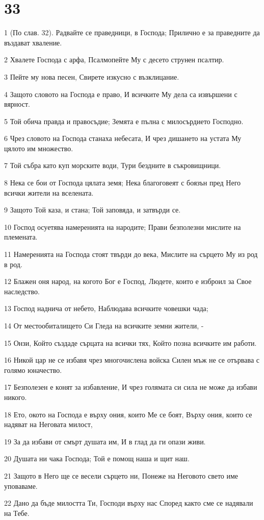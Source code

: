 \chapter{33}

\par 1 (По слав. 32). Радвайте се праведници, в Господа; Прилично е за праведните да въздават хваление.
\par 2 Хвалете Господа с арфа, Псалмопейте Му с десето струнен псалтир.
\par 3 Пейте му нова песен, Свирете изкусно с възклицание.
\par 4 Защото словото на Господа е право, И всичките Му дела са извършени с вярност.
\par 5 Той обича правда и правосъдие; Земята е пълна с милосърдието Господно.
\par 6 Чрез словото на Господа станаха небесата, И чрез дишането на устата Му цялото им множество.
\par 7 Той събра като куп морските води, Тури бездните в съкровищници.
\par 8 Нека се бои от Господа цялата земя; Нека благоговеят с боязън пред Него всички жители на вселената.
\par 9 Защото Той каза, и стана; Той заповяда, и затвърди се.
\par 10 Господ осуетява намеренията на народите; Прави безполезни мислите на племената.
\par 11 Намеренията на Господа стоят твърди до века, Мислите на сърцето Му из род в род.
\par 12 Блажен оня народ, на когото Бог е Господ, Людете, които е изброил за Свое наследство.
\par 13 Господ наднича от небето, Наблюдава всичките човешки чада;
\par 14 От местообиталището Си Гледа на всичките земни жители, -
\par 15 Онзи, Който създаде сърцата на всички тях, Който позна всичките им работи.
\par 16 Никой цар не се избавя чрез многочислена войска Силен мъж не се отървава с голямо юначество.
\par 17 Безполезен е конят за избавление, И чрез голямата си сила не може да избави никого.
\par 18 Ето, окото на Господа е върху ония, които Ме се боят, Върху ония, които се надяват на Неговата милост,
\par 19 За да избави от смърт душата им, И в глад да ги опази живи.
\par 20 Душата ни чака Господа; Той е помощ наша и щит наш.
\par 21 Защото в Него ще се весели сърцето ни, Понеже на Неговото свето име уповаваме.
\par 22 Дано да бъде милостта Ти, Господи върху нас Според както сме се надявали на Тебе.

